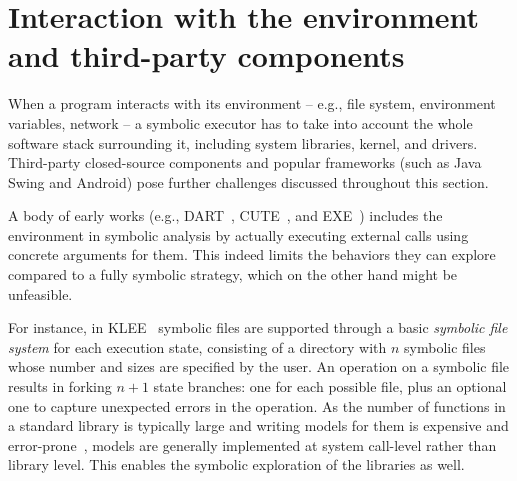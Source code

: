 \section{Interaction with the environment and third-party components}
\label{se:environment-thirdparty}

When a  program interacts with its environment -- e.g., file system, environment variables, network -- a symbolic executor has to take into account the whole software stack surrounding it, including system libraries, kernel, and drivers.
Third-party closed-source components and popular frameworks (such as Java Swing and Android) pose further challenges discussed throughout this section.
 
A body of early works (e.g., {\sc DART}~\cite{DART-PLDI05},  {\sc CUTE}~\cite{CUTE-FSE05}, and {\sc EXE}~\cite{EXE-CCS06}) includes the environment in symbolic analysis by actually executing external calls using concrete arguments for them. This indeed limits the behaviors they can explore compared to a fully symbolic strategy, which on the other hand might be unfeasible. 

 For instance, in {\sc KLEE}~\cite{KLEE-OSDI08} symbolic files are supported through a basic {\em symbolic file system} for each execution state, consisting of a directory with $n$ symbolic files whose number and sizes are specified by the user. An operation on a symbolic file results in forking $n+1$ state branches: one for each possible file, plus an optional one to capture unexpected errors in the operation. As the number of functions in a standard library is typically large and writing models for them is expensive and error-prone~\cite{Ball06}, models are generally implemented at system call-level rather than library level. This enables the symbolic exploration of the libraries as well.

